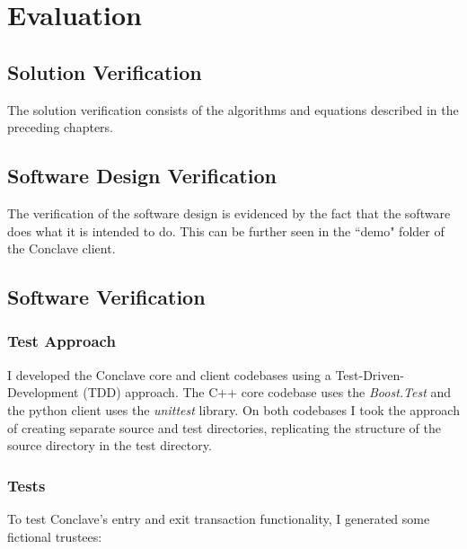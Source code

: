 \documentclass{report}
\begin{document}
\chapter{Evaluation}
	\section{Solution Verification}
	The solution verification consists of the algorithms and equations described in the preceding chapters.
	\section{Software Design Verification}
	The verification of the software design is evidenced by the fact that the software does what it is intended to do. This can be further seen in the ``demo" folder of the Conclave client.
	\section{Software Verification}
		\subsection{Test Approach}
			I developed the Conclave core and client codebases using a Test-Driven-Development (TDD) approach. The C++ core codebase uses the \textit{Boost.Test} and the python client uses the \textit{unittest} library. On both codebases I took the approach of creating separate source and test directories, replicating the structure of the source directory in the test directory.
		\subsection{Tests}
			To test Conclave’s entry and exit transaction functionality, I generated some fictional trustees: \\
			
\end{document}
